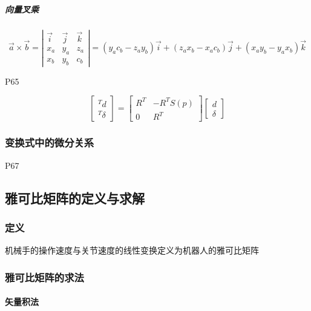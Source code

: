 \documentclass[11pt]{book}
\begin{document}
\subparagraph{向量叉乘}%
\label{par:xiang_liang_cha_cheng_}

$$
	\vec a \times \vec b = 
	\left|
		\begin{matrix}
			\vec i & \vec j & \vec k \\
			x_a & y_a & z_a \\
			x_b & y_b & c_b
		\end{matrix}
	\right|
	= (y_a c_b - z_a y_b) \vec i + (z_a x_b - x_a c_b) \vec j + (x_a y_b - y_a x_b) \vec k
$$

P65

$$
\left[
	\begin{matrix}
		{}^Td \\
		{}^T \delta
	\end{matrix}
\right]
=
\left[
	\begin{matrix}
		R^T & -R^TS(p) \\
		0 & R^T
	\end{matrix}
\right]
\left[
	\begin{matrix}
		d \\
		\delta
	\end{matrix}
\right]
$$

\subsubsection{变换式中的微分关系}%
\label{ssub:bian_huan_shi_zhong_de_wei_fen_guan_xi_}

P67

\subsection{雅可比矩阵的定义与求解}

\subsubsection{定义}%
\label{ssub:ding_yi_}

机械手的操作速度与关节速度的线性变换定义为机器人的雅可比矩阵

\subsubsection{雅可比矩阵的求法}%
\label{ssub:ya_ke_bi_ju_zhen_de_qiu_fa_}

\paragraph{矢量积法}%
\label{par:shi_liang_ji_fa_}
\end{document}
